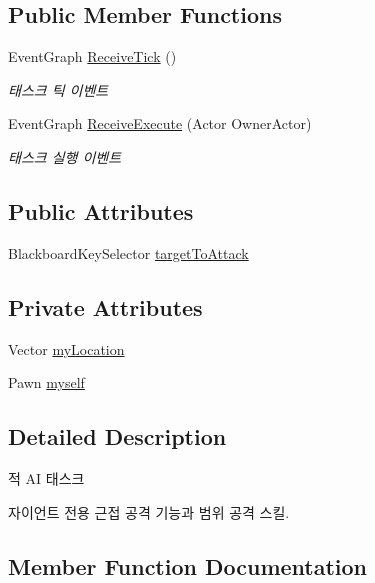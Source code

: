 \subsection*{Public Member Functions}
\begin{DoxyCompactItemize}
\item 
Event\+Graph \hyperlink{class_giant_melee_attack___b_t_task_ab61144023115cd885efb224bdd6e4f05}{Receive\+Tick} ()
\begin{DoxyCompactList}\small\item\em 태스크 틱 이벤트 \end{DoxyCompactList}\item 
Event\+Graph \hyperlink{class_giant_melee_attack___b_t_task_a520142e850626032ecadda6f62b04c9b}{Receive\+Execute} (Actor Owner\+Actor)
\begin{DoxyCompactList}\small\item\em 태스크 실행 이벤트 \end{DoxyCompactList}\end{DoxyCompactItemize}
\subsection*{Public Attributes}
\begin{DoxyCompactItemize}
\item 
Blackboard\+Key\+Selector \hyperlink{class_giant_melee_attack___b_t_task_ace477d8d2d2c02e1ae5220e36e60b6ac}{target\+To\+Attack}
\end{DoxyCompactItemize}
\subsection*{Private Attributes}
\begin{DoxyCompactItemize}
\item 
Vector \hyperlink{class_giant_melee_attack___b_t_task_a6d7cb8d701fc5a62d10180592a1727bf}{my\+Location}
\item 
Pawn \hyperlink{class_giant_melee_attack___b_t_task_a30dd53d02e844eab55652c2fc628b53c}{myself}
\end{DoxyCompactItemize}


\subsection{Detailed Description}
적 AI 태스크 

자이언트 전용 근접 공격 기능과 범위 공격 스킬. 

\subsection{Member Function Documentation}
